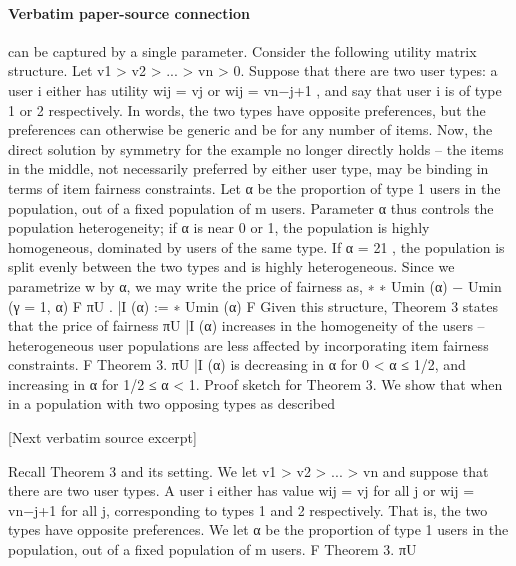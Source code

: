 \documentclass[10pt]{article}
\begin{document}
\paragraph{Verbatim paper-source connection}
\begin{ReviewVerbatim}
can be captured by a single parameter. Consider the following utility matrix structure. Let v1 >
v2 > ... > vn > 0. Suppose that there are two user types: a user i either has utility wij = vj or
wij = vn−j+1 , and say that user i is of type 1 or 2 respectively. In words, the two types have opposite
preferences, but the preferences can otherwise be generic and be for any number of items. Now, the
direct solution by symmetry for the example no longer directly holds – the items in the middle, not
necessarily preferred by either user type, may be binding in terms of item fairness constraints.
Let α be the proportion of type 1 users in the population, out of a fixed population of m users.
Parameter α thus controls the population heterogeneity; if α is near 0 or 1, the population is highly
homogeneous, dominated by users of the same type. If α = 21 , the population is split evenly between
the two types and is highly heterogeneous. Since we parametrize w by α, we may write the price of
fairness as,
∗
∗
Umin
(α) − Umin
(γ = 1, α)
F
πU
.
|I (α) :=
∗
Umin (α)
F
Given this structure, Theorem 3 states that the price of fairness πU
|I (α) increases in the homogeneity
of the users – heterogeneous user populations are less affected by incorporating item fairness
constraints.
F
Theorem 3. πU
|I (α) is decreasing in α for 0 < α ≤ 1/2, and increasing in α for 1/2 ≤ α < 1.
Proof sketch for Theorem 3. We show that when in a population with two opposing types as described

[Next verbatim source excerpt]

Recall Theorem 3 and its setting. We let v1 > v2 > ... > vn and suppose that there are two user
types. A user i either has value wij = vj for all j or wij = vn−j+1 for all j, corresponding to types
1 and 2 respectively. That is, the two types have opposite preferences. We let α be the proportion of
type 1 users in the population, out of a fixed population of m users.
F
Theorem 3. πU
\end{ReviewVerbatim}
\end{document}
